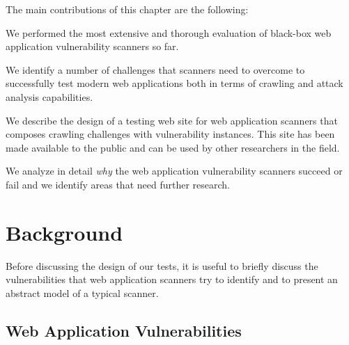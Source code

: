 The main contributions of this chapter are the following:
\begin{compactitem}
\item We performed the most extensive and thorough evaluation of black-box 
web application vulnerability scanners so far.
\item We identify a number of challenges that scanners
need to overcome to successfully test modern web applications both in terms
of crawling and attack analysis capabilities.
\item We describe the design of a testing web site for web application
scanners that composes crawling challenges with vulnerability instances.
This site has been made available to the public and can be used by other
researchers in the field.
\item We analyze in  detail \emph{why} the web application vulnerability
  scanners succeed or fail and we identify areas that need further research.
\end{compactitem}


\section{Background}

Before discussing the design of our tests, it is useful to briefly discuss the
vulnerabilities that web application scanners try to identify and to present
an abstract model of a typical scanner.

\subsection{Web Application Vulnerabilities}

